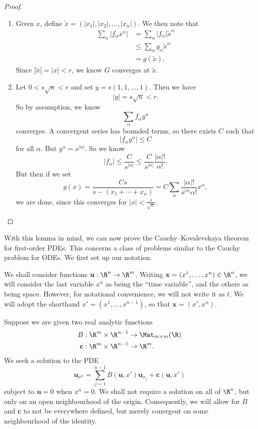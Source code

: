 \documentclass[a4paper]{article}
\begin{document}
\begin{proof}\leavevmode
  \begin{enumerate}
    \item Given $x$, define $\tilde{x} = (|x_1|, |x_2|, \ldots, |x_n|)$. We then note that
      \begin{align*}
        \sum_\alpha |f_\alpha x^\alpha| &= \sum_\alpha |f_\alpha| \tilde{x}^\alpha\\
        &\leq \sum_\alpha g_\alpha \tilde{x}^\alpha\\
        &= g(\tilde{x}).
      \end{align*}
      Since $|\tilde{x}| = |x| < r$, we know $G$ converges at $\tilde{x}$.
    \item Let $0 < s\sqrt{n} < r$ and set $y = s(1, 1, \ldots, 1)$. Then we have
      \[
        |y| = s \sqrt{n} < r.
      \]
      So by assumption, we know
      \[
        \sum_\alpha f_\alpha y^\alpha
      \]
      converges. A convergent series has bounded terms, so there exists $C$ such that
      \[
        |f_\alpha y^\alpha| \leq C
      \]
      for all $\alpha$. But $y^\alpha = s^{|\alpha|}$. So we know
      \[
        |f_\alpha| \leq \frac{C}{s^{|\alpha|}} \leq \frac{C}{s^{|\alpha|}} \frac{|\alpha|!}{\alpha!}.
      \]
      But then if we set
      \[
        g(x) = \frac{Cs}{s - (x_1 + \cdots + x_n)} = C \sum_\alpha \frac{|\alpha|!}{s^{|\alpha|}\alpha!} x^\alpha,
      \]
      we are done, since this converges for $|x| < \frac{s}{\sqrt{n}}$.
  \end{enumerate}
\end{proof}

With this lemma in mind, we can now prove the Cauchy--Kovalevskaya theorem for first-order PDEs. This concerns a class of problems similar to the Cauchy problem for ODEs. We first set up our notation.

We shall consider functions $\mathbf{u}: \R^n \to \R^m$. Writing $\mathbf{x} = (x^1, \ldots, x^n) \in \R^n$, we will consider the last variable $x^n$ as being the ``time variable'', and the others as being space. However, for notational convenience, we will not write it as $t$. We will adopt the shorthand $x' = (x^1, \ldots, x^{n - 1})$, so that $\mathbf{x} = (x', x^n)$.

Suppose we are given two real analytic functions
\begin{align*}
  B: \R^m \times \R^{n - 1} &\to \Mat_{m \times m}(\R)\\
  \mathbf{c}: \R^m \times \R^{n - 1} &\to \R^m.
\end{align*}
We seek a solution to the PDE
\[
  \mathbf{u}_{x^n} = \sum_{j = 1}^{n - 1}B(\mathbf{u}, x') \mathbf{u}_{x_j} + \mathbf{c}(\mathbf{u}, x')
\]
subject to $\mathbf{u} = 0$ when $x^n = 0$. We shall not require a solution on all of $\R^n$, but only on an open neighbourhood of the origin. Consequently, we will allow for $B$ and $\mathbf{c}$ to not be everywhere defined, but merely conergent on some neighbourhood of the identity.
\end{document}

